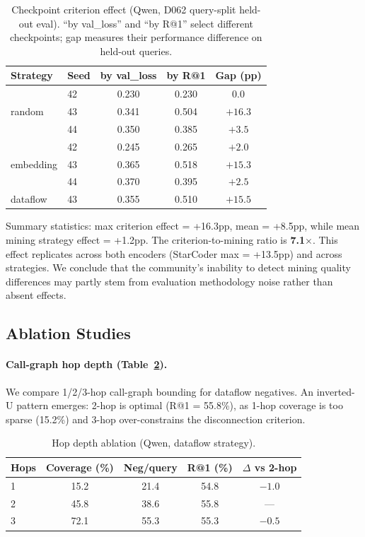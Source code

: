 \documentclass[11pt,a4paper]{article}
\begin{document}
\begin{table}[t]
\centering
\small
\caption{Checkpoint criterion effect (Qwen, D062 query-split held-out eval). ``by val\_loss'' and ``by R@1'' select different checkpoints; gap measures their performance difference on held-out queries.}
\label{tab:criterion}
\begin{tabular}{llccc}
\toprule
Strategy & Seed & by val\_loss & by R@1 & Gap (pp) \\
\midrule
\multirow{3}{*}{random} & 42 & 0.230 & 0.230 & 0.0 \\
& 43 & 0.341 & 0.504 & $+16.3$ \\
& 44 & 0.350 & 0.385 & $+3.5$ \\
\midrule
\multirow{3}{*}{embedding} & 42 & 0.245 & 0.265 & $+2.0$ \\
& 43 & 0.365 & 0.518 & $+15.3$ \\
& 44 & 0.370 & 0.395 & $+2.5$ \\
\midrule
dataflow & 43 & 0.355 & 0.510 & $+15.5$ \\
\bottomrule
\end{tabular}
\end{table}

Summary statistics: max criterion effect = +16.3pp, mean = +8.5pp, while mean mining strategy effect = +1.2pp. The criterion-to-mining ratio is \textbf{7.1$\times$}. This effect replicates across both encoders (StarCoder max = +13.5pp) and across strategies. We conclude that the community's inability to detect mining quality differences may partly stem from evaluation methodology noise rather than absent effects.

\subsection{Ablation Studies}
\label{sec:ablations}

\paragraph{Call-graph hop depth (Table~\ref{tab:hop}).} We compare 1/2/3-hop call-graph bounding for dataflow negatives. An inverted-U pattern emerges: 2-hop is optimal (R@1 = 55.8\%), as 1-hop coverage is too sparse (15.2\%) and 3-hop over-constrains the disconnection criterion.

\begin{table}[t]
\centering
\small
\caption{Hop depth ablation (Qwen, dataflow strategy).}
\label{tab:hop}
\begin{tabular}{lcccc}
\toprule
Hops & Coverage (\%) & Neg/query & R@1 (\%) & $\Delta$ vs 2-hop \\
\midrule
1 & 15.2 & 21.4 & 54.8 & $-1.0$ \\
2 & 45.8 & 38.6 & 55.8 & --- \\
3 & 72.1 & 55.3 & 55.3 & $-0.5$ \\
\bottomrule
\end{tabular}
\end{table}
\end{document}
